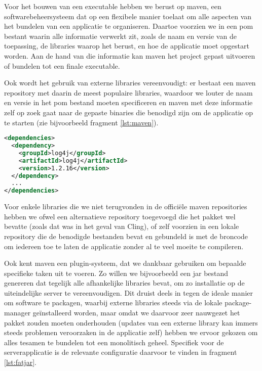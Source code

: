 Voor het bouwen van een executable hebben we berust op \ac{maven}, een softwarebeheersysteem dat op een flexibele manier toelaat om alle aspecten van het bundelen van een applicatie te organiseren. Daartoe voorzien we in een \ac{pom} bestant waarin alle informatie verwerkt zit, zoals de naam en versie van de toepassing, de libraries waarop het berust, en hoe de applicatie moet opgestart worden. Aan de hand van die informatie kan \ac{maven} het project gepast uitvoeren of bundelen tot een finale executable.

Ook wordt het gebruik van externe libraries vereenvoudigt: er bestaat een \ac{maven} repository met daarin de meest populaire libraries, waardoor we louter de naam en versie in het \ac{pom} bestand moeten specificeren en \ac{maven} met deze informatie zelf op zoek gaat naar de gepaste binaries die benodigd zijn om de applicatie op te starten (zie bijvoorbeeld fragment \ref{lst:maven}).

\begin{lstlisting}[language=XML, float, caption=Inladen van externe libraries via Maven., label=lst:maven]
<dependencies>
  <dependency>
    <groupId>log4j</groupId>
    <artifactId>log4j</artifactId>
    <version>1.2.16</version>
  </dependency>
  ...
</dependencies>
\end{lstlisting}

Voor enkele libraries die we niet terugvonden in de officiële \ac{maven} repositories hebben we ofwel een alternatieve repository toegevoegd die het pakket wel bevatte (zoals dat was in het geval van Cling), of zelf voorzien in een lokale repository die de benodigde bestanden bevat en gebundeld is met de broncode om iedereen toe te laten de applicatie zonder al te veel moeite te compileren.

Ook kent \ac{maven} een plugin-systeem, dat we dankbaar gebruiken om bepaalde specifieke taken uit te voeren. Zo willen we bijvoorbeeld een \ac{jar} bestand genereren dat tegelijk alle afhankelijke libraries bevat, om zo installatie op de uiteindelijke server te vereenvoudigen. Dit druist deels in tegen de ideale manier om software te packagen, waarbij externe libraries steeds via de lokale package-manager geïnstalleerd worden, maar omdat we daarvoor zeer nauwgezet het pakket zouden moeten onderhouden (updates van een externe library kan immers steeds problemen veroorzaken in de applicatie zelf) hebben we ervoor gekozen om alles tesamen te bundelen tot een monolitisch geheel. Specifiek voor de serverapplicatie is de relevante configuratie daarvoor te vinden in fragment \ref{lst:fatjar}.


